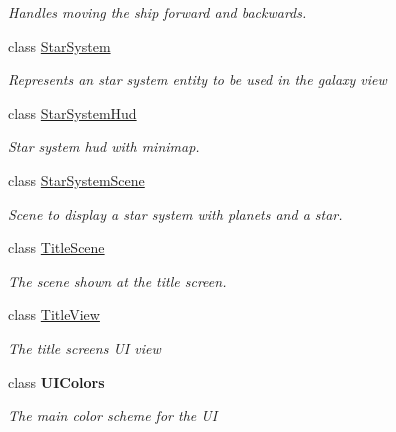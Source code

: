 \begin{DoxyCompactItemize}
\begin{DoxyCompactList}\small\item\em Handles moving the ship forward and backwards. \end{DoxyCompactList}\item 
class \hyperlink{class_midnight_blue_1_1_star_system}{Star\+System}
\begin{DoxyCompactList}\small\item\em Represents an star system entity to be used in the galaxy view \end{DoxyCompactList}\item 
class \hyperlink{class_midnight_blue_1_1_star_system_hud}{Star\+System\+Hud}
\begin{DoxyCompactList}\small\item\em Star system hud with minimap. \end{DoxyCompactList}\item 
class \hyperlink{class_midnight_blue_1_1_star_system_scene}{Star\+System\+Scene}
\begin{DoxyCompactList}\small\item\em Scene to display a star system with planets and a star. \end{DoxyCompactList}\item 
class \hyperlink{class_midnight_blue_1_1_title_scene}{Title\+Scene}
\begin{DoxyCompactList}\small\item\em The scene shown at the title screen. \end{DoxyCompactList}\item 
class \hyperlink{class_midnight_blue_1_1_title_view}{Title\+View}
\begin{DoxyCompactList}\small\item\em The title screens UI view \end{DoxyCompactList}\item 
class {\bfseries U\+I\+Colors}
\begin{DoxyCompactList}\small\item\em The main color scheme for the UI \end{DoxyCompactList}\end{DoxyCompactItemize}
